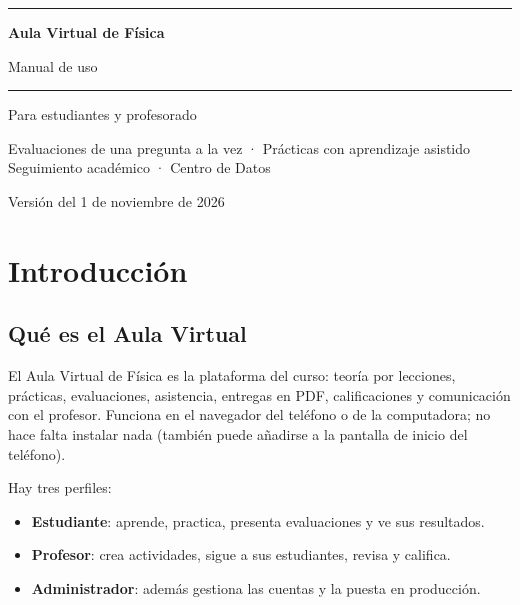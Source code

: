 \documentclass[11pt,a4paper,oneside]{book}
\begin{document}
\begin{titlepage}
  \centering
  \vspace*{3cm}
  {\color{primario}\rule{\linewidth}{1.5pt}\par\vspace{0.6cm}}
  {\Huge\bfseries\color{primario} Aula Virtual de Física\par}
  \vspace{0.4cm}
  {\LARGE Manual de uso\par}
  {\color{primario}\vspace{0.6cm}\rule{\linewidth}{1.5pt}\par}
  \vspace{1.5cm}
  {\large Para estudiantes y profesorado\par}
  \vspace{0.8cm}
  {\normalsize Evaluaciones de una pregunta a la vez · Prácticas con aprendizaje asistido\\
  Seguimiento académico · Centro de Datos\par}
  \vfill
  {\normalsize Versión del 1 de noviembre de 2026\par}
\end{titlepage}

\tableofcontents

\chapter{Introducción}

\section{Qué es el Aula Virtual}
El Aula Virtual de Física es la plataforma del curso: teoría por lecciones, prácticas, evaluaciones, asistencia,
entregas en PDF, calificaciones y comunicación con el profesor. Funciona en el navegador del teléfono o de la
computadora; no hace falta instalar nada (también puede añadirse a la pantalla de inicio del teléfono).

Hay tres perfiles:
\begin{itemize}
  \item \textbf{Estudiante}: aprende, practica, presenta evaluaciones y ve sus resultados.
  \item \textbf{Profesor}: crea actividades, sigue a sus estudiantes, revisa y califica.
  \item \textbf{Administrador}: además gestiona las cuentas y la puesta en producción.
\end{itemize}
\end{document}
